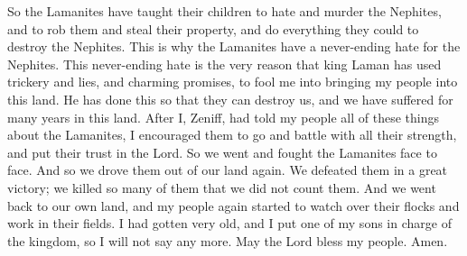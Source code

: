 So the Lamanites have taught their children to hate and murder the Nephites, and to rob them and steal their property, and do everything they could to destroy the Nephites. This is why the Lamanites have a never-ending hate for the Nephites.
\bverse \iffalse For this very cause has king Laman, by his cunning, and lying craftiness, and his fair promises, deceived me, that I have brought this my people up into this land, that they may destroy them; yea, and we have suffered these many years in the land. \fi
This never-ending hate is the very reason that king Laman has used trickery and lies, and charming promises, to fool me into bringing my people into this land. He has done this so that they can destroy us, and we have suffered for many years in this land.
\bverse \iffalse And now I, Zeniff, after having told all these things unto my people concerning the Lamanites, I did stimulate them to go to battle with their might, putting their trust in the Lord; therefore, we did contend with them, face to face. \fi
After I, Zeniff, had told my people all of these things about the Lamanites, I encouraged them to go and battle with all their strength, and put their trust in the Lord. So we went and fought the Lamanites face to face.
\bverse \iffalse And it came to pass that we did drive them again out of our land; and we slew them with a great slaughter, even so many that we did not number them. \fi
And so we drove them out of our land again. We defeated them in a great victory; we killed so many of them that we did not count them.
\bverse \iffalse And it came to pass that we returned again to our own land, and my people again began to tend their flocks, and to till their ground. \fi
And we went back to our own land, and my people again started to watch over their flocks and work in their fields.
\bverse \iffalse And now I, being old, did confer the kingdom upon one of my sons; therefore, I say no more. And may the Lord bless my people. Amen. \fi
I had gotten very old, and I put one of my sons in charge of the kingdom, so I will not say any more. May the Lord bless my people. Amen.

